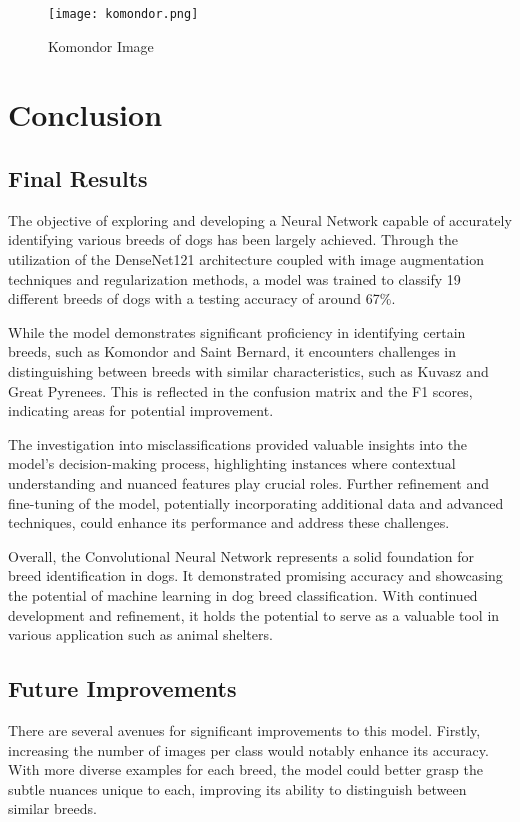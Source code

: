 \documentclass[11pt]{article}
\begin{document}
\begin{figure}[h]
    \centering
    \texttt{[image: komondor.png]}
    \caption{\label{fig:komondor}Komondor Image}
\end{figure}

\newpage
\clearpage
\section{Conclusion}

\subsection{Final Results}

The objective of exploring and developing a Neural Network capable of accurately identifying various breeds of dogs has been largely achieved. Through the utilization of the DenseNet121 architecture coupled with image augmentation techniques and regularization methods, a model was trained to classify 19 different breeds of dogs with a testing accuracy of around 67\%.

While the model demonstrates significant proficiency in identifying certain breeds, such as Komondor and Saint Bernard, it encounters challenges in distinguishing between breeds with similar characteristics, such as Kuvasz and Great Pyrenees. This is reflected in the confusion matrix and the F1 scores, indicating areas for potential improvement.

The investigation into misclassifications provided valuable insights into the model's decision-making process, highlighting instances where contextual understanding and nuanced features play crucial roles. Further refinement and fine-tuning of the model, potentially incorporating additional data and advanced techniques, could enhance its performance and address these challenges.

Overall, the Convolutional Neural Network represents a solid foundation for breed identification in dogs. It demonstrated promising accuracy and showcasing the potential of machine learning in dog breed classification. With continued development and refinement, it holds the potential to serve as a valuable tool in various application such as animal shelters. 

\subsection{Future Improvements}

There are several avenues for significant improvements to this model. Firstly, increasing the number of images per class would notably enhance its accuracy. With more diverse examples for each breed, the model could better grasp the subtle nuances unique to each, improving its ability to distinguish between similar breeds.
\end{document}
